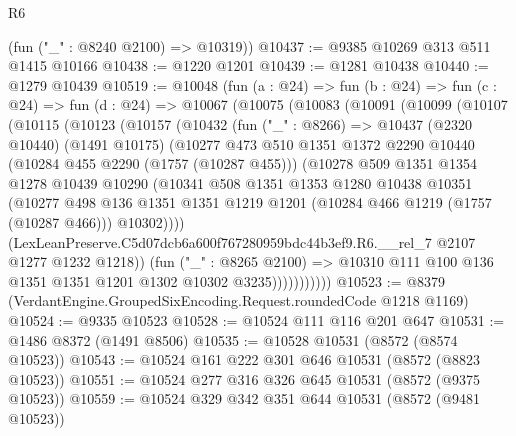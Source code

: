 \begin{lexlean}{R6}
\begin{coremodule}
      (fun ("_" : @8240 @2100) => @10319))
@10437 := @9385 @10269 @313 @511 @1415 @10166
@10438 := @1220 @1201
@10439 := @1281 @10438
@10440 := @1279 @10439
@10519 := @10048
    (fun (a : @24) =>
    fun (b : @24) =>
    fun (c : @24) =>
    fun (d : @24) =>
    @10067
      (@10075
        (@10083
          (@10091
            (@10099
              (@10107
                (@10115
                  (@10123
                    (@10157
                      (@10432
                        (fun ("_" : @8266) =>
                        @10437
                          (@2320 @10440)
                          (@1491 @10175)
                          (@10277
                            @473
                            @510
                            @1351
                            @1372
                            @2290
                            @10440
                            (@10284 @455 @2290 (@1757 (@10287 @455)))
                            (@10278
                              @509
                              @1351
                              @1354
                              @1278
                              @10439
                              @10290
                              (@10341
                                @508
                                @1351
                                @1353
                                @1280
                                @10438
                                @10351
                                (@10277
                                  @498
                                  @136
                                  @1351
                                  @1351
                                  @1219
                                  @1201
                                  (@10284 @466 @1219 (@1757 (@10287 @466)))
                                  @10302))))
                          (LexLeanPreserve.C5d07dcb6a600f767280959bdc44b3ef9.R6.__rel_7
                            @2107
                            @1277
                            @1232
                            @1218))
                        (fun ("_" : @8265 @2100) =>
                        @10310 @111 @100 @136 @1351 @1351 @1201 @1302 @10302 @3235)))))))))))
@10523 := @8379 (VerdantEngine.GroupedSixEncoding.Request.roundedCode @1218 @1169)
@10524 := @9335 @10523
@10528 := @10524 @111 @116 @201 @647
@10531 := @1486 @8372 (@1491 @8506)
@10535 := @10528 @10531 (@8572 (@8574 @10523))
@10543 := @10524 @161 @222 @301 @646 @10531 (@8572 (@8823 @10523))
@10551 := @10524 @277 @316 @326 @645 @10531 (@8572 (@9375 @10523))
@10559 := @10524 @329 @342 @351 @644 @10531 (@8572 (@9481 @10523))

\end{coremodule}
\end{lexlean}
